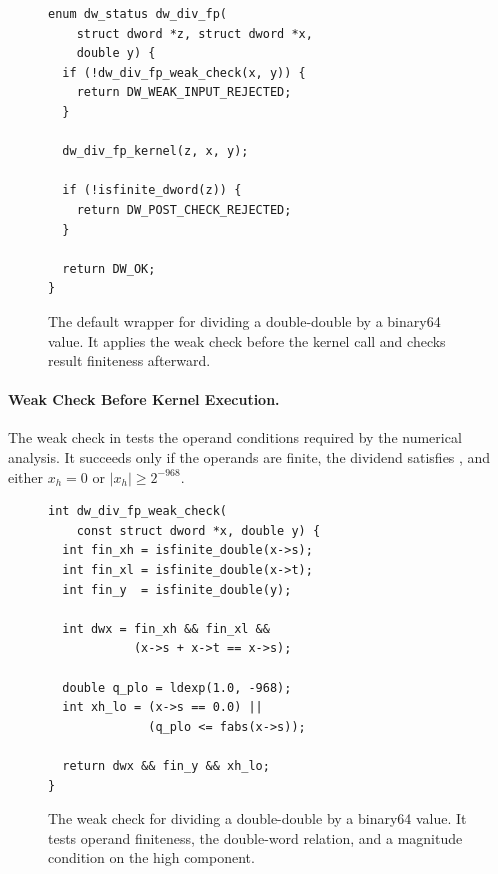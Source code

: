 \begin{figure}[t]
  \begin{sectiontwocpanel}
  \begin{lstlisting}[style=sectiontwoc]
enum dw_status dw_div_fp(
    struct dword *z, struct dword *x,
    double y) {
  if (!dw_div_fp_weak_check(x, y)) {
    return DW_WEAK_INPUT_REJECTED;
  }

  dw_div_fp_kernel(z, x, y);

  if (!isfinite_dword(z)) {
    return DW_POST_CHECK_REJECTED;
  }

  return DW_OK;
}
\end{lstlisting}
  \end{sectiontwocpanel}
\caption{The default wrapper for dividing a double-double by a
binary64 value. It applies the weak check before the kernel call
and checks result finiteness afterward.}
  \label{fig:default-division-wrapper}
\end{figure}

\paragraph{Weak Check Before Kernel Execution.}
The weak check in  tests the operand
conditions required by the numerical analysis. It succeeds only if
the operands are finite, the dividend satisfies
, and either $x_h=0$ or
$|x_h|\geq2^{-968}$.

\begin{figure}[t]
  \begin{sectiontwocpanel}
  \begin{lstlisting}[style=sectiontwoc]
int dw_div_fp_weak_check(
    const struct dword *x, double y) {
  int fin_xh = isfinite_double(x->s);
  int fin_xl = isfinite_double(x->t);
  int fin_y  = isfinite_double(y);

  int dwx = fin_xh && fin_xl &&
            (x->s + x->t == x->s);

  double q_plo = ldexp(1.0, -968);
  int xh_lo = (x->s == 0.0) ||
              (q_plo <= fabs(x->s));

  return dwx && fin_y && xh_lo;
}
\end{lstlisting}
  \end{sectiontwocpanel}
\caption{The weak check for dividing a double-double by a binary64
value. It tests operand finiteness, the double-word relation, and
a magnitude condition on the high component.}
\label{fig:dw-div-fp-input-check}
\end{figure}

